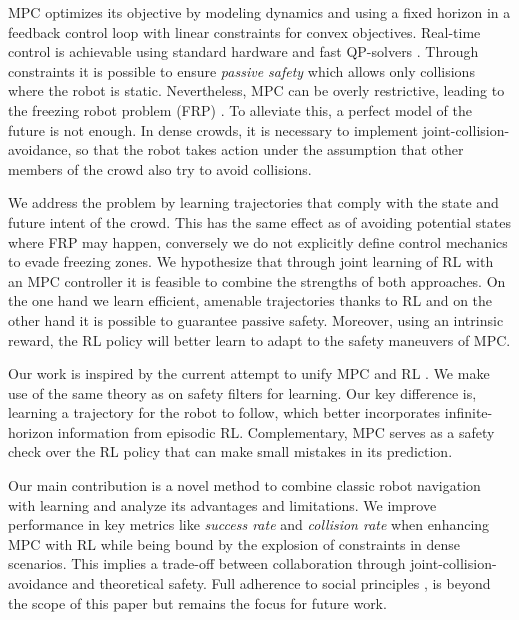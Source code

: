 \documentclass[letterpaper,conference,10pt]{IEEEconf}
\begin{document}

    MPC optimizes its objective by modeling dynamics and using a fixed horizon in a feedback control loop with linear constraints for convex objectives. Real-time control is achievable using standard hardware and fast QP-solvers \cite{goulart_clarabel_2024}. Through constraints it is possible to ensure  \textit{passive safety} \cite{macek_towards_2009} which allows only collisions where the robot is static. Nevertheless, MPC can be overly restrictive, leading to the freezing robot problem (FRP) \cite{trautman_unfreezing_2010}. To alleviate this, a perfect model of the future is not enough. In dense crowds, it is necessary to implement joint-collision-avoidance, so that the robot takes action under the assumption that other members of the crowd also try to avoid collisions.


    We address the problem by learning trajectories that comply with the state and future intent of the crowd. This has the same effect as \cite{sathyamoorthy_frozone_2020} of avoiding potential states where FRP may happen, conversely we do not explicitly define control mechanics to evade freezing zones. We hypothesize that through joint learning of RL with an MPC controller it is feasible to combine the strengths of both approaches. On the one hand we learn efficient, amenable trajectories thanks to RL and on the other hand it is possible to guarantee passive safety. Moreover, using an intrinsic reward, the RL policy will better learn to adapt to the safety maneuvers of MPC.

    Our work is inspired by the current attempt to unify MPC and RL \cite{reiter_synthesis_2025}. We make use of the same theory as \cite{tearle_predictive_2021,wabersich_predictive_2022,kicki_bridging_2024} on safety filters for learning. Our key difference is, learning a trajectory for the robot to follow, which better incorporates infinite-horizon information from episodic RL. Complementary, MPC serves as a safety check over the RL policy that can make small mistakes in its prediction.


    Our main contribution is a novel method to combine classic robot navigation with learning and analyze its advantages and limitations. We improve performance in key metrics like \textit{success rate} and \textit{collision rate} when enhancing MPC with RL while being bound by the explosion of constraints in dense scenarios. This implies a trade-off between collaboration through joint-collision-avoidance and theoretical safety. Full adherence to social principles \cite{francis_principles_2025}, is beyond the scope of this paper but remains the focus for future work.
\end{document}

